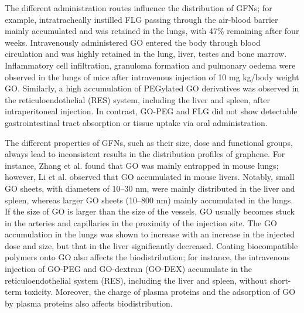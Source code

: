 \documentclass[twoside,twocolumn,9pt]{article}
\begin{document}
The different administration routes influence the distribution of GFNs; for example, intratracheally instilled FLG passing through the air-blood barrier mainly accumulated and was retained in the lungs, with 47\% remaining after four weeks. Intravenously administered GO entered the body through blood circulation and was highly retained in the lung, liver, testes and bone marrow. Inflammatory cell infiltration, granuloma formation and pulmonary oedema were observed in the lungs of mice after intravenous injection of 10 mg kg/body weight GO. Similarly, a high accumulation of PEGylated GO derivatives was observed in the reticuloendothelial (RES) system, including the liver and spleen, after intraperitoneal injection. In contrast, GO-PEG and FLG did not show detectable gastrointestinal tract absorption or tissue uptake via oral administration.

The different properties of GFNs, such as their size, dose and functional groups, always lead to inconsistent results in the distribution profiles of graphene. For instance, Zhang et al. found that GO was mainly entrapped in mouse lungs; however, Li et al. observed that GO accumulated in mouse livers. Notably, small GO sheets, with diameters of 10–30 nm, were mainly distributed in the liver and spleen, whereas larger GO sheets (10–800 nm) mainly accumulated in the lungs. If the size of GO is larger than the size of the vessels, GO usually becomes stuck in the arteries and capillaries in the proximity of the injection site. The GO accumulation in the lungs was shown to increase with an increase in the injected dose and size, but that in the liver significantly decreased. Coating biocompatible polymers onto GO also affects the biodistribution; for instance, the intravenous injection of GO-PEG and GO-dextran (GO-DEX) accumulate in the reticuloendothelial system (RES), including the liver and spleen, without short-term toxicity. Moreover, the charge of plasma proteins and the adsorption of GO by plasma proteins also affects biodistribution.
\end{document}
